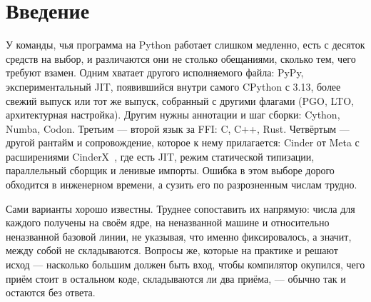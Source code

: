 \documentclass[10pt,a4paper]{article}
\newcommand{\meas}[2]{#2}
\newcommand{\code}[1]{\texttt{\small #1}}
\begin{document}
\begin{abstract}
специализирующий путь, они в $\meas{ratio:b6_static-fork_static_adaptive:matmul96_int/fork_static_adaptive/static_interp|b6_static-fork_static_adaptive:matmul96_int/fork_static_adaptive/boxed_python}{5.8}$~раза медленнее заменяемого ими кода с объектами. Наибольший множитель, доступный без правки
исходника, даёт PyPy: он исполняет наши неизменённые ядра на чистом Python в
$3.2$--$\meas{ratio:b1_compute-314:matmul/cpython_loop|b1_compute-pypy311:matmul/cpython_loop}{42.8}$~раза быстрее, но единственный его вызов \code{ctypes}, передающий через границу
двухмегабайтный буфер, стоит в $\meas{ratio:b2_branchy-pypy311:tokenize/c_ctypes|b2_branchy-314:tokenize/c_ctypes}{5.3}$~раза дороже, чем в CPython, тогда как вызовы, передающие
только целые числа, укладываются в $\meas{pct:b2_branchy-314:binarytrees/rust_ctypes|b2_branchy-pypy311:binarytrees/rust_ctypes}{7}\%$: «перейти на другой рантайм» и «вынести горячий цикл в C»
исключают друг друга лишь там, где через границу идут объёмные данные. Весь код, все файлы результатов
\code{pyperf} и генераторы графиков и таблиц входят в прилагаемый артефакт, каждый график и каждая
таблица этой работы воспроизводятся из этих файлов командами генераторов из \S\ref{sec:repro}.
\end{abstract}

\section{Введение}
\label{sec:intro}

У команды, чья программа на Python работает слишком медленно, есть с десяток средств на выбор, и
различаются они не столько обещаниями, сколько тем, чего требуют взамен. Одним хватает другого
исполняемого файла: PyPy, экспериментальный JIT, появившийся внутри самого CPython с 3.13, более
свежий выпуск или тот же выпуск, собранный с другими флагами (PGO, LTO, архитектурная настройка).
Другим нужны аннотации и шаг сборки: Cython, Numba, Codon. Третьим --- второй язык за FFI: C, C++,
Rust. Четвёртым --- другой рантайм и сопровождение, которое к нему прилагается: Cinder от Meta с
расширениями CinderX~\cite{cinder}, где есть JIT, режим статической типизации, параллельный
сборщик и ленивые импорты. Ошибка в этом выборе дорого обходится в инженерном времени, а
сузить его по разрозненным числам трудно.

Сами варианты хорошо известны. Труднее сопоставить их напрямую: числа для каждого получены на
своём ядре, на неназванной машине и относительно неназванной базовой линии, не указывая, что
именно фиксировалось, а значит, между собой не складываются. Вопросы же, которые на практике и
решают исход --- насколько большим должен быть вход, чтобы компилятор окупился, чего приём стоит
в остальном коде, складываются ли два приёма, --- обычно так и остаются без ответа.
\end{document}
